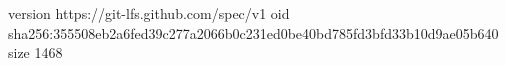 version https://git-lfs.github.com/spec/v1
oid sha256:355508eb2a6fed39c277a2066b0c231ed0be40bd785fd3bfd33b10d9ae05b640
size 1468
